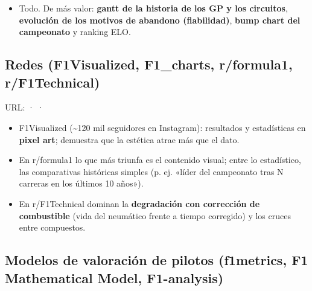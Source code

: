 \begin{itemize}
\item \si{} Todo. De más valor: \textbf{gantt de la historia de los GP y los circuitos}, \textbf{evolución de los motivos de abandono (fiabilidad)}, \textbf{bump chart del campeonato} y ranking ELO.
\end{itemize}

\subsection{Redes (F1Visualized, F1\_charts, r/formula1, r/F1Technical)}

URL: \href{https://x.com/f1visualized}{} · \href{https://x.com/F1_charts}{} · \href{https://f1bythenumbers.com/r-formula1-or-r-f1art/}{}

\begin{itemize}
\item F1Visualized (\textasciitilde{}120 mil seguidores en Instagram): resultados y estadísticas en \textbf{pixel art}; demuestra que la estética atrae más que el dato.
\item En r/formula1 lo que más triunfa es el contenido visual; entre lo estadístico, las comparativas históricas simples (p. ej. «líder del campeonato tras N carreras en los últimos 10 años»).
\item En r/F1Technical dominan la \textbf{degradación con corrección de combustible} (vida del neumático frente a tiempo corregido) y los cruces entre compuestos.
\end{itemize}

\subsection{Modelos de valoración de pilotos (f1metrics, F1 Mathematical Model, F1-analysis)}

